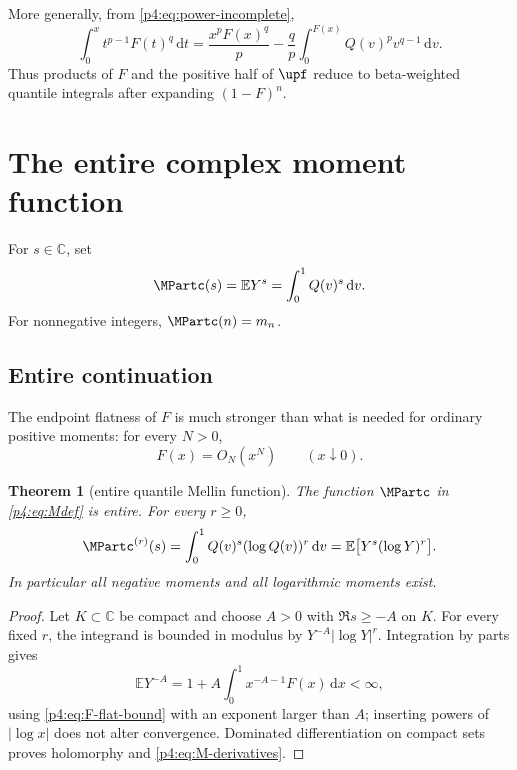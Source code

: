 \documentclass[11pt,oneside]{article}
\newtheorem{theorem}{Theorem}[section]
\theoremstyle{definition}
\theoremstyle{remark}
\newcommand{\F}{F}
\newcommand{\Q}{Q}
\newcommand{\E}{\mathbb E}
\newcommand{\C}{\mathbb C}
\newcommand{\dd}{\,\mathrm d}
\newcommand{\1}{\mathbf 1}
\begin{document}
More generally, from \cref{p4:eq:power-incomplete},
\begin{equation}\label{p4:eq:Fpower-antiderivative}
 \int_0^x t^{p-1}\F(t)^q\dd t
 =\frac{x^p\F(x)^q}{p}
 -\frac{q}{p}\int_0^{\F(x)}\Q(v)^p v^{q-1}\dd v.
\end{equation}
Thus products of \(\F\) and the positive half of \(\upf\) reduce to beta-weighted
quantile integrals after expanding \((1-\F)^n\).

\section{The entire complex moment function}

\begin{definition}\label{p4:def:M}
For \(s\in\C\), set
\begin{equation}\label{p4:eq:Mdef}
 \MPartc(s)=\E Y^s=\int_0^1\Q(v)^s\dd v.
\end{equation}
For nonnegative integers, \(\MPartc(n)=m_n\).
\end{definition}

\subsection{Entire continuation}

The endpoint flatness of \(\F\) is much stronger than what is needed for ordinary
positive moments: for every \(N>0\),
\begin{equation}\label{p4:eq:F-flat-bound}
 \F(x)=O_N(x^N)\qquad(x\downarrow0).
\end{equation}

\begin{theorem}[entire quantile Mellin function]\label{p4:thm:entireM}
The function \(\MPartc\) in \cref{p4:eq:Mdef} is entire.  For every \(r\ge0\),
\begin{equation}\label{p4:eq:M-derivatives}
 \MPartc^{(r)}(s)=\int_0^1\Q(v)^s(\log\Q(v))^r\dd v
 =\E\bigl[Y^s(\log Y)^r\bigr].
\end{equation}
In particular all negative moments and all logarithmic moments exist.
\end{theorem}

\begin{proof}
Let \(K\subset\C\) be compact and choose \(A>0\) with \(\Re s\ge-A\) on \(K\).
For every fixed \(r\), the integrand is bounded in modulus by
\(Y^{-A}|\log Y|^r\).  Integration by parts gives
\[
 \E Y^{-A}=1+A\int_0^1x^{-A-1}\F(x)\dd x<\infty,
\]
using \cref{p4:eq:F-flat-bound} with an exponent larger than \(A\); inserting powers of
\(|\log x|\) does not alter convergence.  Dominated differentiation on compact sets
proves holomorphy and \cref{p4:eq:M-derivatives}.
\end{proof}
\end{document}
